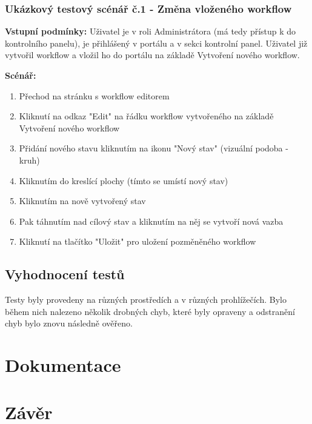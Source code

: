 \documentclass{fithesis}
\begin{document}
\subsection{Ukázkový testový scénář č.1 - Změna vloženého workflow}
\textbf{Vstupní podmínky:} Uživatel je v roli Administrátora (má tedy přístup k do kontrolního panelu), je přihlášený v portálu a v sekci kontrolní panel. Uživatel již vytvořil workflow a vložil ho do portálu na základě Vytvoření nového workflow.

\textbf{Scénář:}
\begin{enumerate}
\item Přechod na stránku s workflow editorem
\item Kliknutí na odkaz "Edit" na řádku workflow vytvořeného na základě Vytvoření nového workflow
\item Přidání nového stavu kliknutím na ikonu "Nový stav" (vizuální podoba - kruh)
\item Kliknutím do kreslící plochy (tímto se umístí nový stav)
\item Kliknutím na nově vytvořený stav 
\item Pak táhnutím nad cílový stav a kliknutím na něj se vytvoří nová vazba
\item Kliknutí na tlačítko "Uložit" pro uložení pozměněného workflow
\end{enumerate}


\section{Vyhodnocení testů}
Testy byly provedeny na různých prostředích a v různých prohlížečích. Bylo během nich nalezeno několik drobných chyb, které byly opraveny a odstranění chyb bylo znovu následně ověřeno.

\chapter{Dokumentace}



\chapter*{Závěr}

\end{document}
